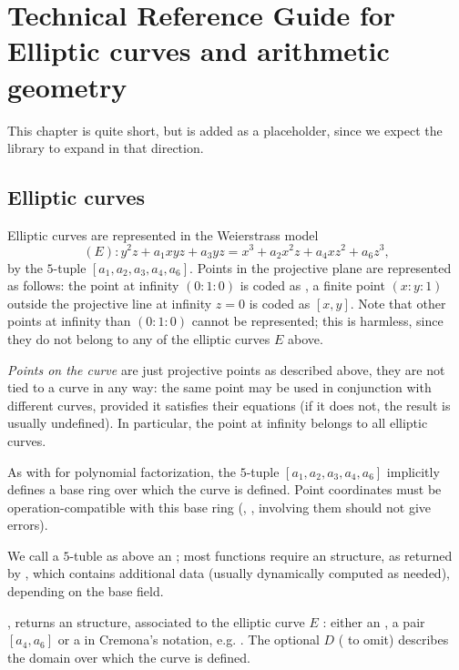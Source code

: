 %
%
\chapter{Technical Reference Guide for Elliptic curves and arithmetic geometry}

This chapter is quite short, but is added as a placeholder, since
we expect the library to expand in that direction.

\section{Elliptic curves}
Elliptic curves are represented in the Weierstrass model
$$ (E): y^2z + a_1xyz + a_3 yz = x^3 + a_2 x^2z + a_4 xz^2 + a_6z^3, $$
by the $5$-tuple $[a_1,a_2,a_3,a_4,a_6]$. Points in the projective
plane are represented as follows: the point at infinity $(0:1:0)$ is coded
as \kbd{[0]}, a finite point $(x:y:1)$ outside the projective line at infinity
$z = 0$ is coded as $[x,y]$. Note that other points at infinity than $(0:1:0)$
cannot be represented; this is harmless, since they do not belong to any of
the elliptic curves $E$ above.

\emph{Points on the curve} are just projective points as described above,
they are not tied to a curve in any way: the same point may be used in
conjunction with different curves, provided it satisfies their equations (if
it does not, the result is usually undefined). In particular, the point at
infinity belongs to all elliptic curves.

As with  for polynomial factorization, the $5$-tuple
$[a_1,a_2,a_3,a_4,a_6]$ implicitly defines a base ring over which the curve
is defined. Point coordinates must be operation-compatible with this
base ring (, ,  involving them should not give
errors).


We call a $5$-tuble as above an ; most functions require an
 structure, as returned by , which contains additional
data (usually dynamically computed as needed), depending on the base field.

, returns an  structure,
associated to the elliptic curve $E$ : either an , a pair $[a_4,a_6]$
or a  in Cremona's notation, e.g. . The optional $D$
( to omit) describes the domain over which the curve is defined.

